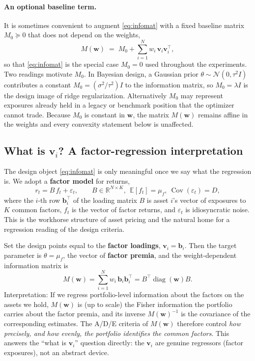 \documentclass[11pt]{article}
\newcommand{\R}{\mathbb{R}}
\newcommand{\E}{\mathbb{E}}
\newcommand{\diag}{\operatorname{diag}}
\newcommand{\w}{\mathbf{w}}
\newcommand{\vv}{\mathbf{v}}
\newcommand{\bb}{\mathbf{b}}
\newcommand{\M}{M(\w)}
\begin{document}
\paragraph{An optional baseline term.}
It is sometimes convenient to augment \eqref{eq:infomat} with a fixed baseline
matrix $M_0\succeq0$ that does not depend on the weights,
\begin{equation}
  \M \;=\; M_0+\sum_{i=1}^{N}w_i\,\vv_i\vv_i^\top ,
  \label{eq:infomat0}
\end{equation}
so that \eqref{eq:infomat} is the special case $M_0=0$ used throughout the
experiments. Two readings motivate $M_0$. In Bayesian design, a Gaussian prior
$\theta\sim\mathcal N(0,\tau^2I)$ contributes a constant
$M_0=(\sigma^2/\tau^2)I$ to the information matrix, so $M_0=\lambda I$ is the
design image of ridge regularization. Alternatively $M_0$ may represent
exposures already held in a legacy or benchmark position that the optimizer
cannot trade. Because $M_0$ is constant in $\w$, the matrix $\M$ remains affine
in the weights and every convexity statement below is unaffected.

\subsection{What is $\vv_i$? A factor-regression interpretation}
\label{sec:vi}
The design object \eqref{eq:infomat} is only meaningful once we say what the
regression is. We adopt a \textbf{factor model} for returns,
\begin{equation}
  r_t = B\,f_t + \varepsilon_t,
  \qquad B\in\R^{N\times K},\ \
  \E[f_t]=\mu_f,\ \operatorname{Cov}(\varepsilon_t)=D,
  \label{eq:factor}
\end{equation}
where the $i$-th row $\bb_i^\top$ of the loading matrix $B$ is asset $i$'s vector
of exposures to $K$ common factors, $f_t$ is the vector of factor returns, and
$\varepsilon_t$ is idiosyncratic noise. This is the workhorse structure of asset
pricing \cite{fama1993} and the natural home for a regression reading of the
design criteria.

Set the design points equal to the \textbf{factor loadings}, $\vv_i=\bb_i$. Then
the target parameter is $\theta=\mu_f$, the vector of \textbf{factor premia}, and
the weight-dependent information matrix is
\begin{equation}
  \M=\sum_{i=1}^{N} w_i\,\bb_i\bb_i^\top=B^\top\diag(\w)B .
  \label{eq:factorinfo}
\end{equation}
Interpretation: If we regress portfolio-level information about the factors on
the assets we hold, $\M$ is (up to scale) the Fisher information the portfolio
carries about the factor premia, and its inverse $\M^{-1}$ is the covariance of
the corresponding estimates. The A/D/E criteria of $\M$ therefore control
\emph{how precisely, and how evenly, the portfolio identifies the common
factors}. This answers the ``what is $\vv_i$'' question directly: the $\vv_i$ are
genuine regressors (factor exposures), not an abstract device.
\end{document}
